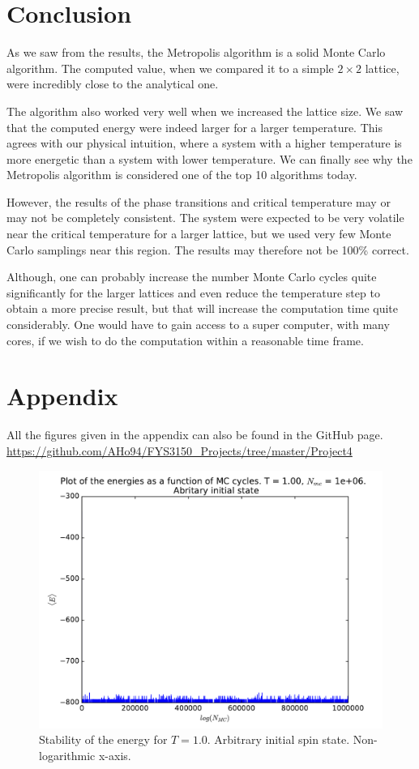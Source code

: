 \documentclass[12pt]{article}
\begin{document}
\FloatBarrier
\section{Conclusion} \label{section:conclusion}
As we saw from the results, the Metropolis algorithm is a solid Monte Carlo algorithm. The computed value, when we compared it to a simple $2\times 2$ lattice, were incredibly close to the analytical one. 

The algorithm also worked very well when we increased the lattice size. We saw that the computed energy were indeed larger for a larger temperature. This agrees with our physical intuition, where a system with a higher temperature is more energetic than a system with lower temperature. We can finally see why the Metropolis algorithm is considered one of the top 10 algorithms today.

However, the results of the phase transitions and critical temperature may or may not be completely consistent. The system were expected to be very volatile near the critical temperature for a larger lattice, but we used very few Monte Carlo samplings near this region. The results may therefore not be 100\% correct.

Although, one can probably increase the number Monte Carlo cycles quite significantly for the larger lattices and even reduce the temperature step to obtain a more precise result, but that will increase the computation time quite considerably. One would have to gain access to a super computer, with many cores, if we wish to do the computation within a reasonable time frame.
\FloatBarrier

\section{Appendix}
All the figures given in the appendix can also be found in the GitHub page.
\url{https://github.com/AHo94/FYS3150_Projects/tree/master/Project4}
\begin{figure}[H]
\centering
\includegraphics[width=\linewidth]{Plots/Energy_stability_T1.pdf}
\caption{Stability of the energy for $T = 1.0$. Arbitrary initial spin state. Non-logarithmic x-axis.}
\end{figure}
\end{document}
